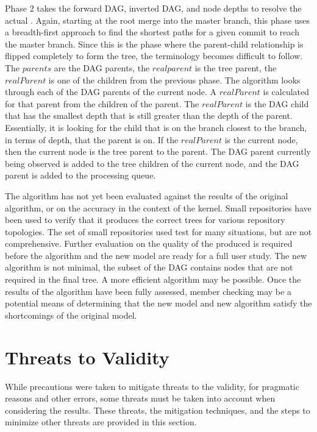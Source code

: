 Phase 2 takes the forward DAG, inverted DAG, and node depths to resolve
the actual \mt{}. Again, starting at the root merge into the master
branch, this phase uses a breadth-first approach to find the shortest
paths for a given commit to reach the master branch. Since this is the
phase where the parent-child relationship is flipped completely to form
the tree, the terminology becomes difficult to follow. The $parents$ are
the DAG parents, the $realparent$ is the tree parent, the $realParent$
is one of the children from the previous phase. The algorithm looks
through each of the DAG parents of the current node. A $realParent$ is
calculated for that parent from the children of the parent. The
$realParent$ is the DAG child that has the smallest depth that is still
greater than the depth of the parent. Essentially, it is looking for the
child that is on the branch closest to the branch, in terms of depth,
that the parent is on. If the $realParent$ is the current node, then the
current node is the tree parent to the parent. The DAG parent currently
being observed is added to the tree children of the current node, and
the DAG parent is added to the processing queue. 

The algorithm has not yet been evaluated against the results of the
original algorithm, or on the accuracy in the context of the kernel.
Small repositories have been used to verify that it produces the correct
trees for various repository topologies. The set of small repositories
used test for many situations, but are not comprehensive. Further
evaluation on the quality of the  produced is required before the
algorithm and the new model are ready for a full user study. The new
algorithm is not minimal, the subset of the DAG contains nodes that are
not required in the final tree. A more efficient algorithm may be
possible. Once the results of the algorithm have been fully assessed,
member checking may be a potential means of determining that the new
model and new algorithm satisfy the shortcomings of the original model.

\section{Threats to Validity}\label{sec:threats_to_validity}

While precautions were taken to mitigate threats to the validity, for
pragmatic reasons and other errors, some threats must be taken into
account when considering the results. These threats, the mitigation
techniques, and the steps to minimize other threats are provided in this
section.

